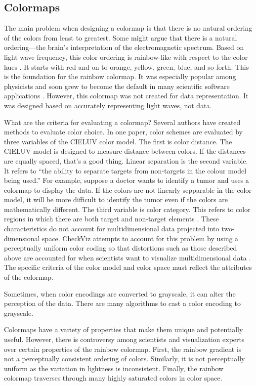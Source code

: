 \documentclass[journal,12pt]{IEEEtran}
\begin{document}
\subsection{Colormaps}

The main problem when designing a colormap is that there is no natural ordering of the colors
from least to greatest. Some might argue that there is a natural
ordering---the brain's interpretation of the electromagnetic spectrum.
Based on light wave frequency, this color ordering is rainbow-like with respect
to the color hues \cite{colormapping}. It starts with red and on to orange,
yellow, green, blue, and so forth. This is the foundation for the rainbow colormap.
It was especially popular among physicists and soon grew to become the default
in many scientific software applications \cite{rainbowstill,matlab}. However,
this colormap was not created for data representation. It was designed based
on accurately representing light waves, not data.

What are the criteria for evaluating a colormap? Several authors have created
methods to evaluate color
choice. In one paper, color schemes are evaluated by
three variables of the CIELUV color model. The first
is color distance. The CIELUV model is designed to
measure distance between colors. If the distances are
equally spaced, that’s a good thing. Linear separation
is the second variable. It refers to “the ability to separate targets
from non-targets in the colour model being
used.” For example, suppose a doctor wants to identify
a tumor and uses a colormap to display the data. If the
colors are not linearly sepparable in the color model, it
will be more difficult to identify the tumor even if the
colors are mathematically different. The third variable
is color category. This refers to color regions in which
there are both target and non-target elements \cite{colorchoice}.
 These characteristics do not account for multidimensional data projected into two-dimensional
space. CheckViz attempts to account for this problem
by using a perceptually uniform color coding so that
distortions such as those described above are accounted for when 
scientists want to visualize multidimensional data \cite{checkviz}.
The specific criteria of the color
model and color space must reflect the attributes of the colormap.
\par
Sometimes, when color encodings are converted to
grayscale, it can alter the perception of the data. There
are many algorithms to cast a color encoding to grayscale.


Colormaps have a variety of properties that make them unique and potentially
useful. However, there is controversy among scientists and visualization
experts over certain properties of the rainbow colormap. First, the rainbow
gradient is not a perceptually consistent ordering of colors. Similarly, it
is not perceptually uniform as the variation in lightness is inconsistent.
Finally, the rainbow colormap traverses through many
highly saturated colors in color space.
\end{document}
